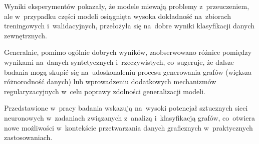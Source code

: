 Wyniki eksperymentów pokazały, że modele miewają problemy z~przeuczeniem,
ale w~przypadku części modeli osiągnięta wysoka dokładność na~zbiorach treningowych i~walidacyjnych,
przełożyła się na~dobre wyniki klasyfikacji danych zewnętrznych.

Generalnie, pomimo ogólnie dobrych wyników,
zaobserwowano różnice pomiędzy wynikami na~danych syntetycznych i~rzeczywistych,
co~sugeruje, że dalsze badania mogą skupić się na~udoskonaleniu procesu generowania grafów (większa różnorodność danych)
lub wprowadzeniu dodatkowych mechanizmów regularyzacyjnych w~celu poprawy zdolności generalizacji modeli.

Przedstawione w~pracy badania wskazują na~wysoki potencjał sztucznych sieci neuronowych
w~zadaniach związanych z~analizą i~klasyfikacją grafów,
co~otwiera nowe możliwości w~kontekście przetwarzania danych graficznych w~praktycznych zastosowaniach.